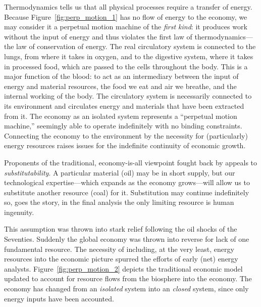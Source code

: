 Thermodynamics tells us that all physical processes require
a transfer of energy.
Because Figure~\ref{fig:perp_motion_1} has no flow of energy
to the economy,
we may consider it a perpetual motion machine
of the \emph{first kind}:
it produces work without the input of energy and
thus violates the first law of thermodynamics---the 
law of conservation of energy.\cite{Rao2004}
The real circulatory system is connected to the lungs,
from where it takes in oxygen,
and to the digestive system, 
where it takes in processed food,
which are passed to the cells throughout the body.
This is a major function of the blood:
to act as an intermediary between the input of energy
and material resources,
the food we eat and air we breathe,
and the internal working of the body.
The circulatory system is necessarily connected 
to its environment and circulates energy and materials
that have been extracted from it.
The economy as an isolated system
represents a ``perpetual motion machine,'' %
seemingly able to operate indefinitely with 
no binding constraints.
Connecting the economy to the environment
by the necessity for (particularly) energy
resources raises issues for the indefinite
continuity of economic growth.

Proponents of the traditional, 
economy-is-all viewpoint fought back
by appeals to \emph{substitutability}.
A particular material (oil) may be in short supply,
but our technological expertise---which expands
as the economy grows---will allow us to substitute
another resource (coal) for it.
Substitution may continue indefinitely so,
goes the story,
in the final analysis the only limiting resource is
human ingenuity.\cite{Simon1981, Simon1998}

This assumption was thrown into stark relief following the oil
shocks of the Seventies.
Suddenly the global economy was thrown
into reverse for lack of one fundamental resource.
The necessity of including,
at the very least,
energy resources into the economic picture
spurred the efforts of early (net) energy 
analysts.\cite{Gilliland1975, Chapman1976}
Figure~\ref{fig:perp_motion_2} depicts the traditional
economic model updated to account for 
resource flows from the biosphere
into the economy.
The economy has changed from an \emph{isolated}
system into an \emph{closed} system,
since only energy inputs have been accounted.

